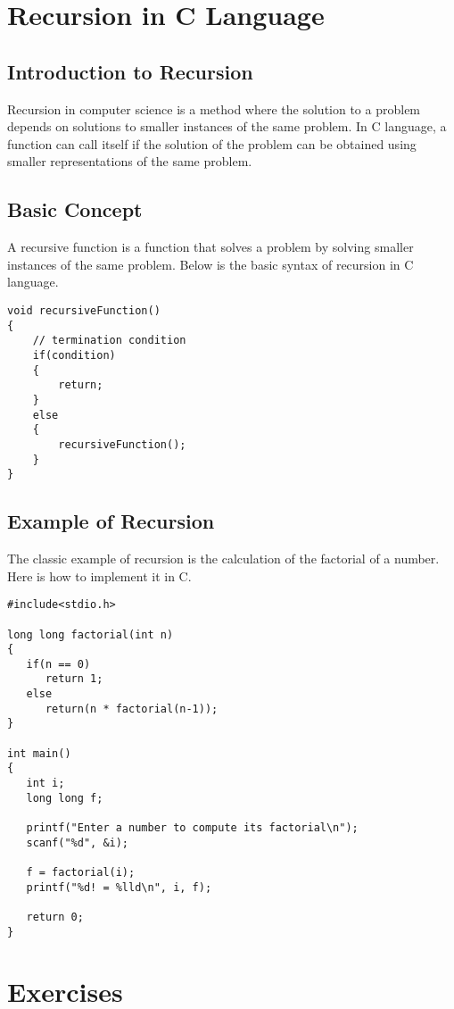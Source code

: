 \section{Recursion in C Language}
\label{ch:recursion}

\subsection{Introduction to Recursion}
Recursion in computer science is a method where the solution to a problem depends on solutions to smaller instances of the same problem. In C language, a function can call itself if the solution of the problem can be obtained using smaller representations of the same problem.

\subsection{Basic Concept}
A recursive function is a function that solves a problem by solving smaller instances of the same problem. Below is the basic syntax of recursion in C language.

\begin{verbatim}
void recursiveFunction()
{
    // termination condition
    if(condition)
    {
        return;
    }
    else
    {
        recursiveFunction();
    }
}
\end{verbatim}

\subsection{Example of Recursion}
The classic example of recursion is the calculation of the factorial of a number. Here is how to implement it in C.

\begin{verbatim}
#include<stdio.h>

long long factorial(int n)
{
   if(n == 0)
      return 1;
   else
      return(n * factorial(n-1));
}

int main()
{
   int i;
   long long f;

   printf("Enter a number to compute its factorial\n");
   scanf("%d", &i);

   f = factorial(i);
   printf("%d! = %lld\n", i, f);

   return 0;
}
\end{verbatim}

\section{Exercises}

